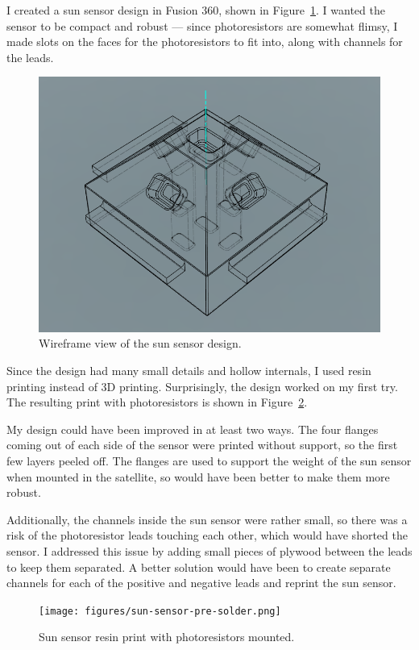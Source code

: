 I created a sun sensor design in Fusion 360, shown in Figure~\ref{fig:sun-sensor-wireframe}. I wanted the sensor to be compact and robust --- since photoresistors are somewhat flimsy, I made slots on the faces for the photoresistors to fit into, along with channels for the leads.
\begin{figure}[!ht]
    \centering
    \includegraphics[width=0.8\linewidth]{figures/sun-sensor-wireframe.PNG}
    \caption{Wireframe view of the sun sensor design.}
    \label{fig:sun-sensor-wireframe}
\end{figure}

Since the design had many small details and hollow internals, I used resin printing instead of 3D printing. Surprisingly, the design worked on my first try. The resulting print with photoresistors is shown in Figure~\ref{fig:sun-sensor-pre-solder}. 

My design could have been improved in at least two ways. The four flanges coming out of each side of the sensor were printed without support, so the first few layers peeled off. The flanges are used to support the weight of the sun sensor when mounted in the satellite, so would have been better to make them more robust. 

Additionally, the channels inside the sun sensor were rather small, so there was a risk of the photoresistor leads touching each other, which would have shorted the sensor. I addressed this issue by adding small pieces of plywood between the leads to keep them separated. A better solution would have been to create separate channels for each of the positive and negative leads and reprint the sun sensor. 
\begin{figure}[!ht]
    \centering
    \texttt{[image: figures/sun-sensor-pre-solder.png]}
    \caption{Sun sensor resin print with photoresistors mounted.}
    \label{fig:sun-sensor-pre-solder}
\end{figure}

